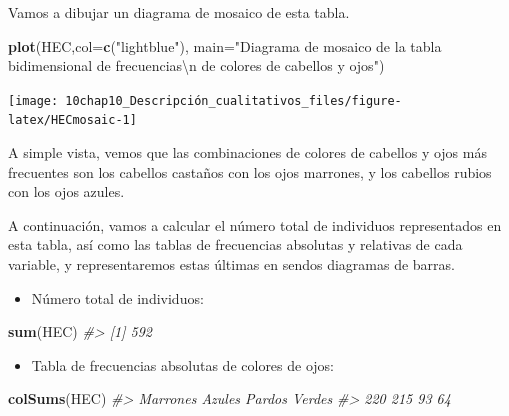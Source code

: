 \documentclass[
]{book}
\newenvironment{Shaded}{\begin{snugshade}}{\end{snugshade}}
\newcommand{\CharTok}[1]{\textcolor[rgb]{0.31,0.60,0.02}{#1}}
\newcommand{\CommentTok}[1]{\textcolor[rgb]{0.56,0.35,0.01}{\textit{#1}}}
\newcommand{\DataTypeTok}[1]{\textcolor[rgb]{0.13,0.29,0.53}{#1}}
\newcommand{\KeywordTok}[1]{\textcolor[rgb]{0.13,0.29,0.53}{\textbf{#1}}}
\newcommand{\NormalTok}[1]{#1}
\newcommand{\StringTok}[1]{\textcolor[rgb]{0.31,0.60,0.02}{#1}}
\providecommand{\tightlist}{%
  \setlength{\itemsep}{0pt}\setlength{\parskip}{0pt}}
\theoremstyle{definition}
\theoremstyle{definition}
\theoremstyle{definition}
\theoremstyle{remark}
\begin{document}
Vamos a dibujar un diagrama de mosaico de esta tabla.

\begin{Shaded}
\begin{Highlighting}[]
\KeywordTok{plot}\NormalTok{(HEC,}\DataTypeTok{col=}\KeywordTok{c}\NormalTok{(}\StringTok{"lightblue"}\NormalTok{),}
     \DataTypeTok{main=}\StringTok{"Diagrama de mosaico de la tabla bidimensional de frecuencias}\CharTok{\textbackslash{}n}\StringTok{ de colores de cabellos y ojos"}\NormalTok{)}
\end{Highlighting}
\end{Shaded}

\begin{center}\texttt{[image: 10chap10\_Descripción\_cualitativos\_files/figure-latex/HECmosaic-1]} \end{center}

A simple vista, vemos que las combinaciones de colores de cabellos y ojos más frecuentes son
los cabellos castaños con los ojos marrones, y los cabellos rubios con los ojos azules.

A continuación, vamos a calcular el número total de individuos representados en esta tabla, así como las tablas de frecuencias absolutas y relativas de cada variable, y representaremos estas últimas en sendos diagramas de barras.

\begin{itemize}
\tightlist
\item
  Número total de individuos:
\end{itemize}

\begin{Shaded}
\begin{Highlighting}[]
\KeywordTok{sum}\NormalTok{(HEC)}
\CommentTok{\#\textgreater{} [1] 592}
\end{Highlighting}
\end{Shaded}

\begin{itemize}
\tightlist
\item
  Tabla de frecuencias absolutas de colores de ojos:
\end{itemize}

\begin{Shaded}
\begin{Highlighting}[]
\KeywordTok{colSums}\NormalTok{(HEC)}
\CommentTok{\#\textgreater{} Marrones   Azules   Pardos   Verdes }
\CommentTok{\#\textgreater{}      220      215       93       64}
\end{Highlighting}
\end{Shaded}
\end{document}
